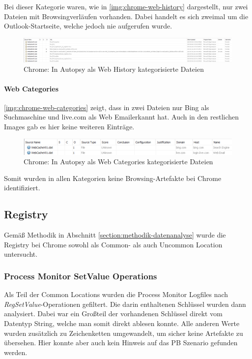 \begin{appendices}
Bei dieser Kategorie waren, wie in \autoref{img:chrome-web-history} dargestellt, nur zwei Dateien mit Browsingverläufen vorhanden. Dabei handelt es sich zweimal um die Outlook-Startseite, welche jedoch nie aufgerufen wurde.

\begin{figure}[ht]
	\centering
	\includegraphics[width=\textwidth]{bilder/CHHis.png}
	\caption{Chrome: In Autopsy als \glqq{}Web History\grqq{} kategorisierte Dateien}
	\label{img:chrome-web-history}  
\end{figure}

\paragraph*{Web Categories}\label{chap:anhang-chrome-uncommon-autopsy-web-categories}
\autoref{img:chrome-web-categories} zeigt, dass in zwei	 Dateien nur Bing als Suchmaschine und live.com als \glqq{}Web Email\grqq erkannt hat. Auch in den restlichen Images gab es hier keine weiteren Einträge.


\begin{figure}[h!]
	\centering
	\includegraphics[width=\textwidth]{bilder/CHCat2.png}
	\caption{Chrome: In Autopsy als \glqq{}Web Categories\grqq{} kategorisierte Dateien}
	\label{img:chrome-web-categories}  
\end{figure}

Somit wurden in allen Kategorien keine Browsing-Artefakte bei Chrome identifiziert.

\subsection{Registry}\label{chap:anhang-chrome-registry}
Gemäß Methodik in Abschnitt \ref{section:methodik-datenanalyse} wurde die Registry bei Chrome sowohl als Common- als auch Uncommon Location untersucht.

\subsubsection*{Process Monitor SetValue Operations}\label{chap:anhang-chrome-common-registry}
Als Teil der Common Locations wurden die Process Monitor Logfiles nach \textit{RegSetValue}-Operationen gefiltert. Die darin enthaltenen Schlüssel wurden dann analysiert. Dabei war ein Großteil der vorhandenen Schlüssel direkt vom Datentyp String, welche man somit direkt ablesen konnte. Alle anderen Werte wurden zusätzlich zu Zeichenketten umgewandelt, um sicher keine Artefakte zu übersehen. Hier konnte aber auch kein Hinweis auf das PB Szenario gefunden werden. 


\end{appendices}
